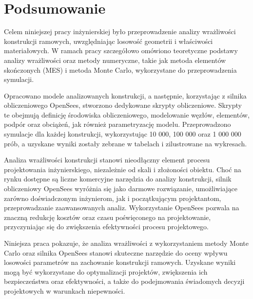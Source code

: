 \section{Podsumowanie}

Celem niniejszej pracy inżynierskiej było przeprowadzenie analizy wrażliwości konstrukcji ramowych, uwzględniając losowość geometrii i właściwości materiałowych.
W ramach pracy szczegółowo omówiono teoretyczne podstawy analizy wrażliwości oraz metody numeryczne, takie jak metoda elementów skończonych (MES) i metoda Monte Carlo, wykorzystane do przeprowadzenia symulacji.

Opracowano modele analizowanych konstrukcji, a następnie, korzystając z silnika obliczeniowego OpenSees, stworzono dedykowane skrypty obliczeniowe.
Skrypty te obejmują definicję środowiska obliczeniowego, modelowanie węzłów, elementów, podpór oraz obciążeń, jak również parametryzację modelu.
Przeprowadzono symulacje dla każdej konstrukcji, wykorzystując 10 000, 100 000 oraz 1 000 000 prób, a uzyskane wyniki zostały zebrane w tabelach i zilustrowane na wykresach.

Analiza wrażliwości konstrukcji stanowi nieodłączny element procesu projektowania inżynierskiego, niezależnie od skali i złożoności obiektu.
Choć na rynku dostępne są liczne komercyjne narzędzia do analizy konstrukcji, silnik obliczeniowy OpenSees wyróżnia się jako darmowe rozwiązanie, umożliwiające zarówno doświadczonym inżynierom, jak i początkującym projektantom, przeprowadzanie zaawansowanych analiz.
Wykorzystanie OpenSees pozwala na znaczną redukcję kosztów oraz czasu poświęconego na projektowanie, przyczyniając się do zwiększenia efektywności procesu projektowego.

Niniejsza praca pokazuje, że analiza wrażliwości z wykorzystaniem metody Monte Carlo oraz silnika OpenSees stanowi skuteczne narzędzie do oceny wpływu losowości parametrów na zachowanie konstrukcji ramowych.
Uzyskane wyniki mogą być wykorzystane do optymalizacji projektów, zwiększenia ich bezpieczeństwa oraz efektywności, a także do podejmowania świadomych decyzji projektowych w warunkach niepewności.